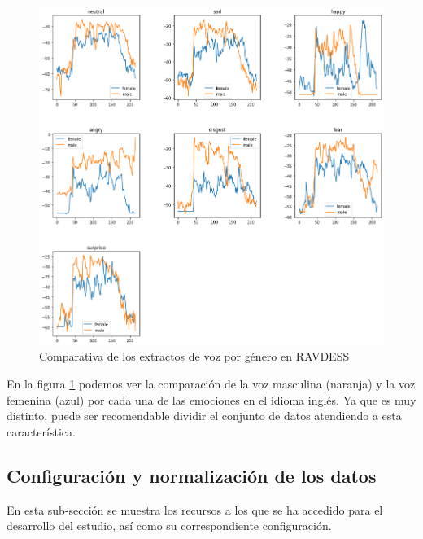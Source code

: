 \documentclass[11pt,a4paper,spanish]{book}
\begin{document}
	\begin{figure}[H]
		\centering
		\includegraphics[scale=0.35]{comparative_waveform.png} 
		\caption{Comparativa de los extractos de voz por género en RAVDESS}
		\label{fig:comp_emociones_genero}
	\end{figure}
	En la figura \ref{fig:comp_emociones_genero} podemos ver la comparación de la voz masculina (naranja) y la voz femenina (azul) por cada una de las emociones en el idioma inglés. Ya que es muy distinto, puede ser recomendable dividir el conjunto de datos atendiendo a esta característica.
	
	
	
	\subsection{Configuración y normalización de los datos}
	En esta sub-sección se muestra los recursos a los que se ha accedido para el desarrollo del estudio, así como su correspondiente configuración.

\end{document}
